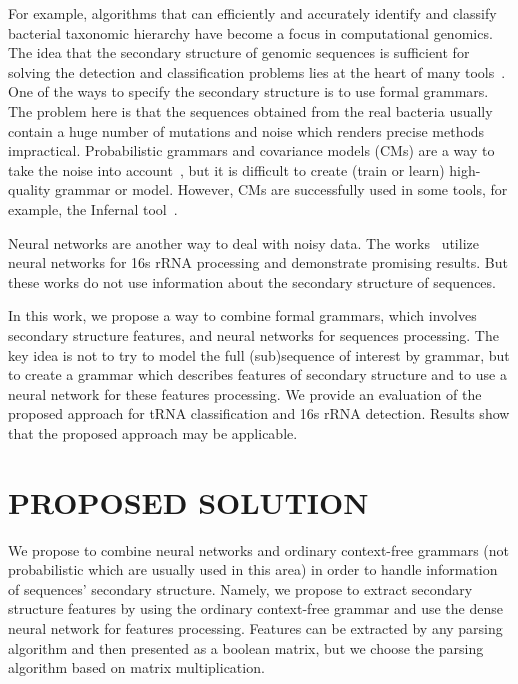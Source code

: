 \documentclass[a4paper,twoside]{article}
\begin{document}
For example, algorithms that can efficiently and accurately identify and classify bacterial taxonomic hierarchy have become a focus in computational genomics.
The idea that the secondary structure of genomic sequences is sufficient for solving the detection and classification problems lies at the heart of many tools~\cite{GrammarsRNA,PCFG,meta,LWPCFG}.
One of the ways to specify the secondary structure is to use formal grammars. 
The problem here is that the sequences obtained from the real bacteria usually contain a huge number of mutations and noise which renders precise methods impractical. 
Probabilistic grammars and covariance models (CMs) are a way to take the noise into account~\cite{EddyDurbin}, but it is difficult to create (train or learn) high-quality grammar or model.
However, CMs are successfully used in some tools, for example, the Infernal tool~\cite{Infernal}.

Neural networks are another way to deal with noisy data. 
The works~\cite{Humidor,ANN} utilize neural networks for 16s rRNA processing and demonstrate promising results.
But these works do not use information about the secondary structure of sequences.

In this work, we propose a way to combine formal grammars, which involves secondary structure features, and neural networks for sequences processing.
The key idea is not to try to model the full (sub)sequence of interest by grammar, but to create a grammar which describes features of secondary structure and to use a neural network for these features processing.
We provide an evaluation of the proposed approach for tRNA classification and 16s rRNA detection.
Results show that the proposed approach may be applicable.

\section{\uppercase{Proposed solution}}
\label{sec:proposedSolution}

\noindent We propose to combine neural networks and ordinary context-free grammars (not probabilistic which are usually used in this area) in order to handle information of sequences' secondary structure. 
Namely, we propose to extract secondary structure features by using the ordinary context-free grammar and use the dense neural network for features processing.
Features can be extracted by any parsing algorithm and then presented as a boolean matrix, but we choose the parsing algorithm based on matrix multiplication.
\end{document}
